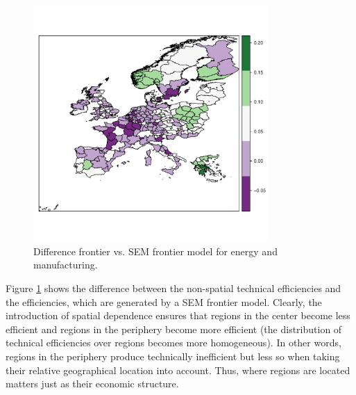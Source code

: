 \documentclass[11pt,parskip,abstracton,notitlepage]{scrartcl}
\begin{document}
\begin{figure}[h]
	\center
	\includegraphics[width=0.8\textwidth]{fig/TEfrontierdiff}
	\caption{Difference frontier vs. SEM frontier model for energy and manufacturing.}
	\label{fig:TEfrontierdiff}
\end{figure}

Figure \ref{fig:TEfrontierdiff} shows the difference between the non-spatial technical efficiencies and the efficiencies, which are generated by a SEM frontier model. Clearly, the introduction of spatial dependence ensures that regions in the center become less efficient and regions in the periphery become more efficient (the distribution of technical efficiencies over regions becomes more homogeneous). In other words, regions in the periphery produce technically inefficient but less so when taking their relative geographical location into account. Thus, where regions are located matters just as their economic structure. 
 
\end{document}
